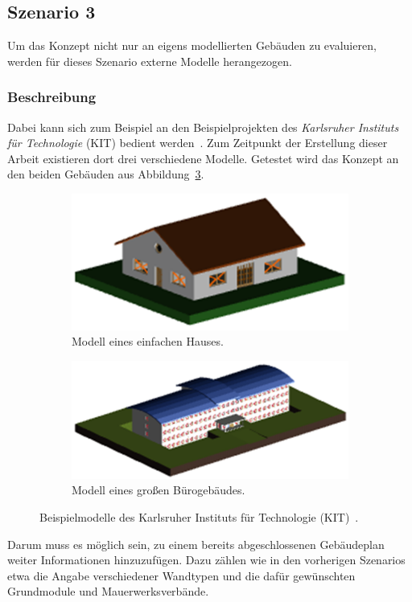 \subsection{Szenario 3}\label{scenarios:scenario3}
Um das Konzept nicht nur an eigens modellierten Gebäuden zu evaluieren, werden für dieses Szenario externe Modelle herangezogen.
\subsubsection*{Beschreibung}
Dabei kann sich zum Beispiel an den Beispielprojekten des \textit{Karlsruher Instituts für Technologie} (KIT) bedient werden~\cite{KITSAMPLEHOUSE:online}.
Zum Zeitpunkt der Erstellung dieser Arbeit existieren dort drei verschiedene Modelle.
Getestet wird das Konzept an den beiden Gebäuden aus Abbildung~\ref{fig:scenarios:Scenario3 KIT}.
\begin{figure}[htb]
  \begin{subfigure}[b]{0.5\columnwidth}
    \includegraphics[width=\columnwidth]{fig/KIT-Haus.png}
    \caption{Modell eines einfachen Hauses.}\label{fig:scenarios:scenario3 kit haus}
  \end{subfigure}
  \hfill
  \begin{subfigure}[b]{0.5\columnwidth}
    \includegraphics[width=\columnwidth]{fig/KIT-Buerogebaeude.png}
    \caption{Modell eines großen Bürogebäudes.}\label{fig:scenarios:scenario3 kit office}
  \end{subfigure}
  \caption{Beispielmodelle des Karlsruher Instituts für Technologie (KIT)~\cite{KITSAMPLEHOUSE:online}.}\label{fig:scenarios:Scenario3 KIT}
\end{figure}

Darum muss es möglich sein, zu einem bereits abgeschlossenen Gebäudeplan weiter Informationen hinzuzufügen.
Dazu zählen wie in den vorherigen Szenarios etwa die Angabe verschiedener Wandtypen und die dafür gewünschten Grundmodule und Mauerwerksverbände.


